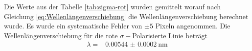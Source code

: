Die Werte aus der Tabelle \autoref{tab:sigma-rot} wurden gemittelt worauf nach Gleichung \eqref{eq:Wellenlängenverschiebung} die Wellenlängenverschiebung berechnet wurde.
Es wurde ein systematische Fehler von $\pm 5$ Pixeln angenommen.
Die Wellenlängenverschiebung für die rote $\sigma -$Polarisierte Linie beträgt
\begin{align*}
    \lambda =&  \SI{0.00544(020)}{\nano\meter} \\
\end{align*}
